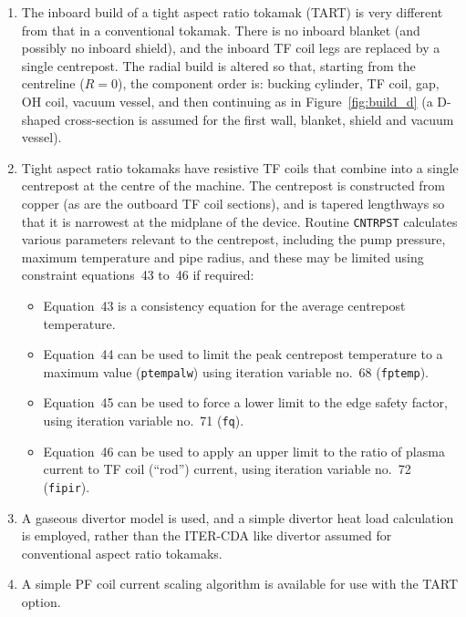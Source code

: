 \documentclass[11pt,a4paper]{report}
\begin{document}
\begin{enumerate}

\item The inboard build of a tight aspect ratio tokamak (TART) is very
  different from that in a conventional tokamak. There is no inboard blanket
  (and possibly no inboard shield), and the inboard TF coil legs are replaced
  by a single centrepost. The radial build is altered so that, starting from
  the centreline ($R = 0$), the component order is: bucking cylinder, TF coil,
  gap, OH coil, vacuum vessel, and then continuing as in Figure~\ref{fig:build_d}
  (a D-shaped cross-section is assumed for the first wall, blanket, shield and
  vacuum vessel).

\item Tight aspect ratio tokamaks have resistive TF coils that combine into a
  single centrepost at the centre of the machine. The centrepost is
  constructed from copper (as are the outboard TF coil sections), and is
  tapered lengthways so that it is narrowest at the midplane of the device.
  Routine \texttt{CNTRPST} calculates various parameters relevant to the
  centrepost, including the pump pressure, maximum temperature and pipe
  radius, and these may be limited using constraint equations~43 to~46 if
  required:

  \begin{itemize}
  \item Equation~43 is a consistency equation for the average centrepost
    temperature.
  \item Equation~44 can be used to limit the peak centrepost temperature to a
    maximum value (\texttt{ptempalw}) using iteration variable no.\ 68
    (\texttt{fptemp}).
  \item Equation~45 can be used to force a lower limit to the edge safety
    factor, using iteration variable no.\ 71 (\texttt{fq}).
  \item Equation~46 can be used to apply an upper limit to the ratio of plasma
    current to TF coil (``rod'') current, using iteration variable no.\ 72
    (\texttt{fipir}).
  \end{itemize}

\item A gaseous divertor model is used, and a simple divertor heat load
  calculation is employed, rather than the ITER-CDA like divertor assumed for
  conventional aspect ratio tokamaks.

\item A simple PF coil current scaling algorithm is available for use with the
  TART option.


\end{enumerate}
\end{document}
